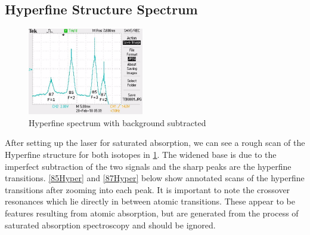 \documentclass[12pt]{article}
\begin{document}
	\pagebreak
	\subsection{Hyperfine Structure Spectrum}
		
	\begin{multicols}{2}
	\begin{figure}[H]
		\includegraphics[width=0.45\textwidth]{Hyperfine_Structure/AnnotatedHyperFineStructureSpectrum.JPG}
		\caption{Hyperfine spectrum with background subtracted}
		\label{HyperfineStructure}
	\end{figure}
	
	\columnbreak
	
	After setting up the laser for saturated absorption, we can see a rough scan of the Hyperfine structure for both isotopes in \cref{HyperfineStructure}. The widened base is due to the imperfect subtraction of the two signals and the sharp peaks are the hyperfine transitions. \cref{85Hyper} and \cref{87Hyper} below show annotated scans of the hyperfine transitions after zooming into each peak. It is important to note the crossover resonances which lie directly in between atomic transitions. These appear to be features resulting from atomic absorption, but are generated from the process of saturated absorption spectroscopy and should be ignored.
	\end{multicols}
	
\end{document}
